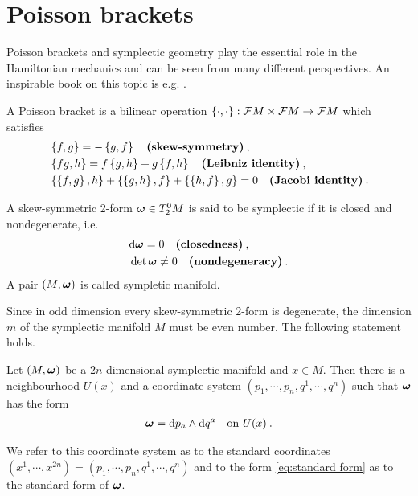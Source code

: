 \section{Poisson brackets}

Poisson brackets and symplectic geometry play the essential role in the Hamiltonian mechanics and can be seen from many different perspectives. An inspirable book on this topic is e.g. \cite{Marsden}.  

\begin{definition}
    A Poisson bracket is a bilinear operation $\left \lbrace \cdot, \cdot \right \rbrace : \mathcal{F} M \times \mathcal{F} M \to \mathcal{F} M$ which satisfies
    \begin{align}
        &\left \lbrace f,g \right \rbrace = -\left \lbrace g,f \right \rbrace \quad \textbf{(skew-symmetry)} \:, \\
        &\left \lbrace fg,h \right \rbrace = f \left \lbrace g,h \right \rbrace + g \left \lbrace f,h \right \rbrace \quad \textbf{(Leibniz identity)} \:, \\
        &\left \lbrace \left \lbrace f,g \right \rbrace,h \right \rbrace + \left \lbrace \left \lbrace g,h \right \rbrace,f \right \rbrace + \left \lbrace \left \lbrace h,f \right \rbrace,g \right \rbrace = 0 \quad \textbf{(Jacobi identity)} \:.
    \end{align}
\end{definition}

\begin{definition}
    A skew-symmetric 2-form $\boldsymbol{\omega} \in T^0_2 M$ is said to be symplectic if it is closed and nondegenerate, i.e.
    \begin{align}
        &\mathrm{d} \boldsymbol{\omega} = 0 \quad \textbf{(closedness)} \:, \\
        &\det \boldsymbol{\omega} \neq 0 \quad \textbf{(nondegeneracy)}\:.
    \end{align}
    A pair $(M,\boldsymbol{\omega})$ is called sympletic manifold.
\end{definition}

Since in odd dimension every skew-symmetric 2-form is degenerate, the dimension $m$ of the symplectic manifold $M$ must be even number. The following statement holds.

\begin{theorem}
    Let $(M,\boldsymbol{\omega})$ be a $2n$-dimensional symplectic manifold and $x \in M$. Then there is a neighbourhood $U(x)$ and a coordinate system $(p_1,\cdots,p_n,q^1,\cdots,q^n)$ such that $\boldsymbol{\omega}$ has the form
    \begin{align}
        \boldsymbol{\omega} = \mathrm{d} p_a \wedge \mathrm{d} q^a \quad \text{on } U(x) \:. \label{eq:standard form}
    \end{align}
\end{theorem}
We refer to this coordinate system as to the standard coordinates \\$(x^1,\cdots, x^{2n}) = (p_1,\cdots,p_n,q^1,\cdots,q^n)$ and to the form \eqref{eq:standard form} as to the standard form of $\boldsymbol{\omega}$.

